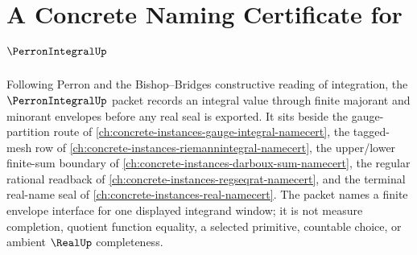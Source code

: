 \chapter{A Concrete Naming Certificate for $\PerronIntegralUp$}
\label{ch:concrete-instances-perron-integral-namecert}

Following Perron and the Bishop--Bridges constructive reading of integration, the $\PerronIntegralUp$ packet records an integral value through finite majorant and minorant envelopes before any real seal is exported. It sits beside the gauge-partition route of \autoref{ch:concrete-instances-gauge-integral-namecert}, the tagged-mesh row of \autoref{ch:concrete-instances-riemannintegral-namecert}, the upper/lower finite-sum boundary of \autoref{ch:concrete-instances-darboux-sum-namecert}, the regular rational readback of \autoref{ch:concrete-instances-regseqrat-namecert}, and the terminal real-name seal of \autoref{ch:concrete-instances-real-namecert}. The packet names a finite envelope interface for one displayed integrand window; it is not measure completion, quotient function equality, a selected primitive, countable choice, or ambient $\RealUp$ completeness.

